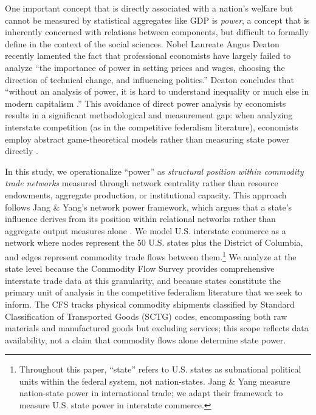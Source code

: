 \documentclass[12pt,oneside]{book}
\begin{document}
One important concept that is directly associated with a nation's welfare but cannot be measured by statistical aggregates like GDP is \textit{power}, a concept that is inherently concerned with relations between components, but difficult to formally define in the context of the social sciences. Nobel Laureate Angus Deaton recently lamented the fact that professional economists have largely failed to analyze ``the importance of power in setting prices and wages, choosing the direction of technical change, and influencing politics.'' Deaton concludes that ``without an analysis of power, it is hard to understand inequality or much else in modern capitalism \cite{deaton_rethinking_2024}.'' This avoidance of direct power analysis by economists results in a significant methodological and measurement gap: when analyzing interstate competition (as in the competitive federalism literature), economists employ abstract game-theoretical models rather than measuring state power directly \cite{weingast_economic_1995}. 

In this study, we operationalize ``power'' as \textit{structural position within commodity trade networks} measured through network centrality rather than resource endowments, aggregate production, or institutional capacity. This approach follows Jang \& Yang's network power framework, which argues that a state's influence derives from its position within relational networks rather than aggregate output measures alone \cite{jang_network_2020, jang_measuring_2023}. We model U.S. interstate commerce as a network where nodes represent the 50 U.S. states plus the District of Columbia, and edges represent commodity trade flows between them.\footnote{Throughout this paper, ``state'' refers to U.S. states as subnational political units within the federal system, not nation-states. Jang \& Yang measure nation-state power in international trade; we adapt their framework to measure U.S. state power in interstate commerce.} We analyze at the state level because the Commodity Flow Survey provides comprehensive interstate trade data at this granularity, and because states constitute the primary unit of analysis in the competitive federalism literature that we seek to inform. The CFS tracks physical commodity shipments classified by Standard Classification of Transported Goods (SCTG) codes, encompassing both raw materials and manufactured goods but excluding services; this scope reflects data availability, not a claim that commodity flows alone determine state power. 
\end{document}
